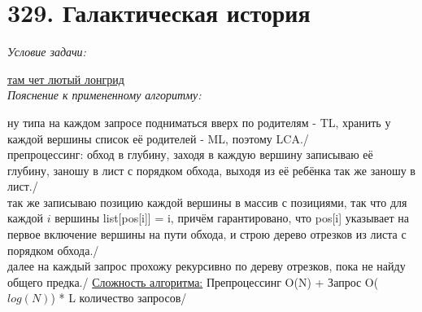 \tableofcontents

\newpage


\section{329. Галактическая история}
\textit{Условие задачи:} \par
\href{https://acm.timus.ru/problem.aspx?space=1&num=1329}{там чет лютый лонгрид}\\

\textit{Пояснение к примененному алгоритму:} \par
ну типа на каждом запросе подниматься вверх по родителям - TL, хранить у каждой вершины список её родителей - ML, поэтому LCA./\\
препроцессинг: обход в глубину, заходя в каждую вершину записываю её глубину, заношу в лист с порядком обхода, выходя из её ребёнка так же заношу в лист./\\
так же записываю позицию каждой вершины в массив с позициями, так что для каждой $i$ вершины list[pos[i]] = i, причём гарантировано,
что pos[i] указывает на первое включение вершины на пути обхода, и строю дерево отрезков из листа с порядком обхода./\\
далее на каждый запрос прохожу рекурсивно по дереву отрезков, пока не найду общего предка./
\underline{Сложность алгоритма:} Препроцессинг O(N) + Запрос O($log(N)$) * L количество запросов/\\


